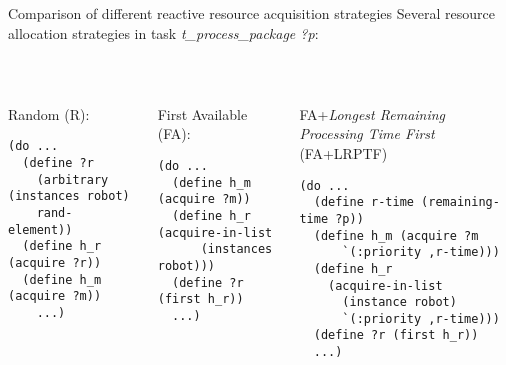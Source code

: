 \begin{frame}[fragile]{Comparison of different reactive resource acquisition strategies}
    Several resource allocation strategies in task \textit{t\_process\_package ?p}:

~~

    \begin{columns}
    \begin{column}{0.33\textwidth}
        \small
        Random (R):
        \tiny
        \setlength{\leftmargini}{0pt}
        \lstset{columns=fullflexible}
        \begin{lstlisting}
(do ...
  (define ?r 
    (arbitrary (instances robot)
    rand-element))
  (define h_r (acquire ?r))
  (define h_m (acquire ?m))
    ...)
        \end{lstlisting}
    \end{column}

    \pause

    \begin{column}{0.33\textwidth}
        \small
        First Available (FA):
        \tiny
        \setlength{\leftmargini}{0pt}
        \lstset{columns=fullflexible}
        \begin{lstlisting}
(do ...
  (define h_m (acquire ?m))
  (define h_r (acquire-in-list
      (instances robot)))
  (define ?r (first h_r))
  ...)
        \end{lstlisting}   
    \end{column}

    \pause

    \begin{column}{0.33\textwidth}
        \small
        FA+\textit{Longest Remaining Processing Time First} (FA+LRPTF)
        \tiny
        \setlength{\leftmargini}{0pt}
        \lstset{columns=fullflexible}
        \begin{lstlisting}
(do ...
  (define r-time (remaining-time ?p))
  (define h_m (acquire ?m 
      `(:priority ,r-time)))
  (define h_r  
    (acquire-in-list 
      (instance robot)
      `(:priority ,r-time)))
  (define ?r (first h_r))
  ...)
        \end{lstlisting}   
    \end{column}
\end{columns}
\end{frame}




